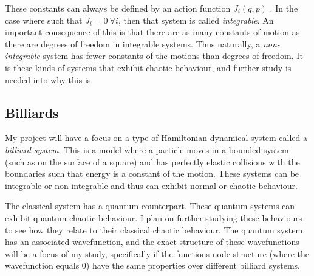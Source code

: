 \documentclass[12pt,a4paper]{amsart}
\begin{document}

These constants can always be defined by an action function $J_{i}(q, p)$ \cite{HILBORN}. In the case where such that $\dot{J_{i}} = 0 \ \forall i$, then that system is called \textit{integrable}. An important consequence of this is that there are as many constants of motion as there are degrees of freedom in integrable systems. Thus naturally, a \textit{non-integrable} system has fewer constants of the motions than degrees of freedom. It is these kinds of systems that exhibit chaotic behaviour, and further study is needed into why this is.

 

\subsection{Billiards}

My project will have a focus on a type of Hamiltonian dynamical system called a \textit{billiard system}. This is a model where a particle moves in a bounded system (such as on the surface of a square) and has perfectly elastic collisions with the boundaries such that energy is a constant of the motion. These systems can be integrable or non-integrable and thus can exhibit normal or chaotic behaviour. 

The classical system has a quantum counterpart. These quantum systems can exhibit quantum chaotic behaviour. I plan on further studying these behaviours to see how they relate to their classical chaotic behaviour. The quantum system has an associated wavefunction, and the exact structure of these wavefunctions will be a focus of my study, specifically if the functions node structure (where the wavefunction equals 0) have the same properties over different billiard systems.

\end{document}
